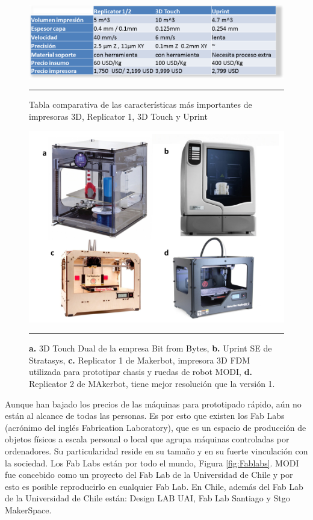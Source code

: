 \begin{figure}[htbp]
	\centering
		\includegraphics[width=\textwidth]{./Figures/tabla_impresoras.png}
		\rule{35em}{0.5pt}
	\caption[Tabla comparativa de Impresoras 3D]{Tabla comparativa de las características más importantes de impresoras 3D, Replicator 1, 3D Touch y Uprint}
	\label{fig:TablaImpresoras}
\end{figure}


\begin{figure}[htbp]
	\centering
		\includegraphics[width=\textwidth]{./Figures/impresoras.png}
		\rule{35em}{0.5pt}
	\caption[Impresoras 3D]{\textbf{a.} 3D Touch Dual de la empresa Bit from Bytes, \textbf{b.} Uprint SE de Stratasys, \textbf{c.} Replicator 1 de Makerbot, impresora 3D FDM utilizada para prototipar chasis y ruedas de robot MODI, \textbf{d.} Replicator 2 de MAkerbot, tiene mejor resolución que la versión 1.}
	\label{fig:impresoras}
\end{figure}	


Aunque han bajado los precios de las máquinas para prototipado rápido, aún no están al alcance de todas las personas. Es por esto que existen los Fab Labs (acrónimo del inglés Fabrication Laboratory), que es un espacio de producción de objetos físicos a escala personal o local que agrupa máquinas controladas por ordenadores. Su particularidad reside en su tamaño y en su fuerte vinculación con la sociedad. Los Fab Labs están por todo el mundo, Figura \ref{fig:Fablabs}. MODI fue concebido como un proyecto del Fab Lab de la Universidad de Chile y por esto es posible reproducirlo en cualquier Fab Lab. En Chile, además del Fab Lab de la Universidad de Chile están: Design LAB UAI, Fab Lab Santiago y Stgo MakerSpace. 

